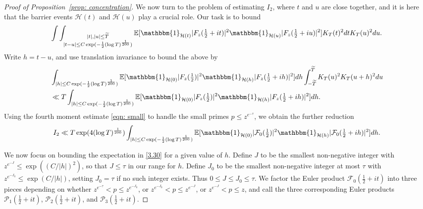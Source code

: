 \documentclass[12pt, notitlepage]{amsart}
\numberwithin{equation}{section}
\def\E{\mathbb E}
\def\TT{\widetilde{T}}
\theoremstyle{remark}
\theoremstyle{definition}
\theoremstyle{remark}
\numberwithin{equation}{section}
\begin{document}
\begin{proof}[Proof of Proposition~\ref{prop: concentration}]
  
\vspace{12pt}

We now turn to the problem of estimating $I_2$, where $t$ and $u$ are close together, and it is here that the barrier events $\mathcal{H}(t)$ and ${\mathcal H}(u)$  play a crucial role.  Our task is to bound
\begin{equation*}
  \int \int _{\substack{ |t|, |u| \le \TT \\ |t-u|\le C \exp(-\frac 12(\log T)^{\frac 1{200} })  } }   \E [\mathbbm{1}_{\mathcal{H}(t)} |F_z(\tfrac 12+it)|^{2} \mathbbm{1}_{\mathcal{H}(u)} |F_z(\tfrac 12+iu)|^{2}] K_T(t)^{2}dt K_T(u)^{2}du.        
\end{equation*}
Write $h=t-u$, and use translation invariance to bound the above by 
\begin{align*} 
&\int_{|h| \le C \exp(-\frac 12 (\log T)^{\frac 1{200} })     } \E[ \mathbbm{1}_{\mathcal{H}(0)} |F_z(\tfrac 12)|^{2} \mathbbm{1}_{\mathcal{H}(h)} |F_z(\tfrac 12+ih)|^{2}] dh \int_{-\TT}^{\TT} K_T(u)^2 K_T(u+h)^2 du \nonumber \\ 
&\ll T \int_{|h| \le C \exp(-\frac 12 (\log T)^{\frac 1{200} })     } \E[ \mathbbm{1}_{\mathcal{H}(0)} |F_z(\tfrac 12)|^{2} \mathbbm{1}_{\mathcal{H}(h)} |F_z(\tfrac 12+ih)|^{2}] dh.
\end{align*} 
Using the fourth moment estimate \eqref{eqn: small} to handle the small primes $p\le z^{e^{-\tau}}$, we obtain the further reduction 
\begin{equation} 
\label{3.30} 
I_2 \ll T \exp(4(\log T)^{\frac 1{200}})  \int_{|h| \le C \exp(-\frac 12 (\log T)^{\frac 1{200} })    } \E[ \mathbbm{1}_{\mathcal{H}(0)} |{\mathcal F}_0(\tfrac 12)|^2 \mathbbm{1}_{\mathcal{H}(h)} |{\mathcal F}_0(\tfrac 12+ih)|^2 ] dh. 
\end{equation} 


We now focus on bounding the expectation in \eqref{3.30} for a given value of $h$.   Define $J$ to be the smallest non-negative integer with $z^{e^{-J}} \le \exp((C/|h|)^2)$, so that $J\le \tau$ in our range for $h$.  Define $J_0$ to be the smallest non-negative integer at most $\tau$ with $z^{e^{-J_0}} \le \exp(C/|h|)$, setting $J_0=\tau$ if no such integer exists.   Thus $0\le J \le J_0 \le \tau$.  We factor the Euler product ${\mathcal F}_0(\tfrac 12+it)$ into three pieces depending on whether $z^{e^{-\tau}} < p \le z^{e^{-J_0}}$, or $z^{e^{-J_0}}< p \le z^{e^{-J}}$, or $z^{e^{-J}} < p \le z$, and call the three corresponding Euler products ${\mathcal P}_1(\tfrac 12+it)$, ${\mathcal P}_2(\tfrac 12+it)$, and ${\mathcal P}_3(\tfrac 12+it)$.   


\end{proof}
\end{document}
